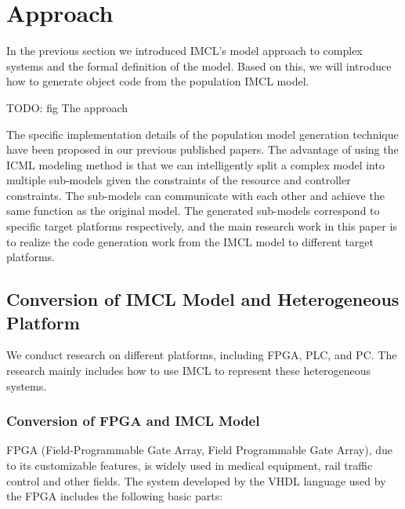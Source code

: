 \section{Approach}
In the previous section we introduced IMCL's model approach to complex systems and the formal definition of the model. Based on this, we will introduce how to generate object code from the population IMCL model.

TODO: fig The approach

The specific implementation details of the population model generation technique have been proposed in our previous published papers. The advantage of using the ICML modeling method is that we can intelligently split a complex model into multiple sub-models given the constraints of the resource and controller constraints. The sub-models can communicate with each other and achieve the same function as the original model. The generated sub-models correspond to specific target platforms respectively, and the main research work in this paper is to realize the code generation work from the IMCL model to different target platforms.


\subsection{Conversion of IMCL Model and Heterogeneous Platform}
We conduct research on different platforms, including FPGA, PLC, and PC. The research mainly includes how to use IMCL to represent these heterogeneous systems.

\subsubsection{\textbf{Conversion of FPGA and IMCL Model}}
FPGA (Field-Programmable Gate Array, Field Programmable Gate Array), due to its customizable features, is widely used in medical equipment, rail traffic control and other fields. The system developed by the VHDL language used by the FPGA includes the following basic parts:


